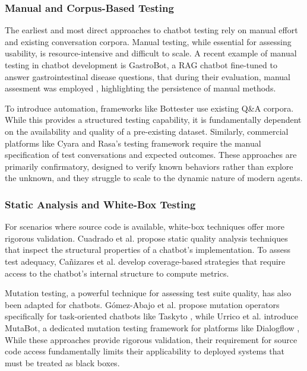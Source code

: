 \subsubsection{Manual and Corpus-Based Testing}

The earliest and most direct approaches to chatbot testing
rely on manual effort and existing conversation corpora.
Manual testing, while essential for assessing usability,
is resource-intensive and difficult to scale.
A recent example of manual testing in chatbot development is GastroBot,
a \ac{RAG} chatbot fine-tuned
to answer gastrointestinal disease questions,
that during their evaluation, manual assesment was employed \autocite{zhouGastroBotChineseGastrointestinal2024},
highlighting the persistence of manual methods.

To introduce automation, frameworks like Bottester
\autocite{vasconcelosBottesterTestingConversational2017}
use existing Q\&A corpora.
While this provides a structured testing capability,
it is fundamentally dependent
on the availability and quality of a pre-existing dataset.
Similarly, commercial platforms like Cyara \autocite{CyaraBotium}
and Rasa's testing framework \autocite{RasaTest2025}
require the manual specification of test conversations and expected outcomes.
These approaches are primarily confirmatory,
designed to verify known behaviors rather than explore the unknown,
and they struggle to scale to the dynamic nature of modern agents.

\subsubsection{Static Analysis and White-Box Testing}

For scenarios where source code is available,
white-box techniques offer more rigorous validation.
Cuadrado et al. \autocite{cuadradoIntegratingStaticQuality2024}
propose static quality analysis techniques
that inspect the structural properties of a chatbot's implementation.
To assess test adequacy, Cañizares et al.
\autocite{canizaresCoveragebasedStrategiesAutomated2024}
develop coverage-based strategies that
require access to the chatbot's internal structure to compute metrics.

Mutation testing, a powerful technique for assessing test suite quality,
has also been adapted for chatbots.
Gómez-Abajo et al. \autocite{gomez-abajoMutationTestingTaskOriented2024}
propose mutation operators specifically for task-oriented chatbots like Taskyto \autocite{sanchezcuadradoAutomatingDevelopmentTaskoriented2024},
while Urrico et al. \autocite{urricoMutaBotMutationTesting2024} introduce MutaBot,
a dedicated mutation testing framework for platforms like Dialogflow \autocite{Dialogflow},
While these approaches provide rigorous validation,
their requirement for source code access
fundamentally limits their applicability to deployed systems
that must be treated as black boxes.

